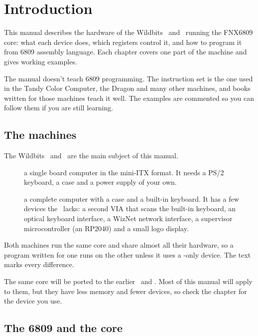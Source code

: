 \chapter{Introduction}
\label{chp:intro}

This manual describes the hardware of the Wildbits \jrtwo\ and \ktwo\ running the FNX6809 core: what each device does, which registers control it, and how to program it from 6809 assembly language. Each chapter covers one part of the machine and gives working examples.

The manual doesn't teach 6809 programming. The instruction set is the one used in the Tandy Color Computer, the Dragon and many other machines, and books written for those machines teach it well. The examples are commented so you can follow them if you are still learning.

\section{The machines}

The Wildbits \jrtwo\ and \ktwo\ are the main subject of this manual.

\begin{description}
    \item[\jrtwo] a single board computer in the mini-ITX format. It needs a PS/2 keyboard, a case and a power supply of your own.
    \item[\ktwo] a complete computer with a case and a built-in keyboard. It has a few devices the \jrtwo\ lacks: a second VIA that scans the built-in keyboard, an optical keyboard interface, a WizNet network interface, a supervisor microcontroller (an RP2040) and a small logo display.
\end{description}

Both machines run the same core and share almost all their hardware, so a program written for one runs on the other unless it uses a \ktwo-only device. The text marks every difference.

\begin{note}
    The same core will be ported to the earlier \fjr\ and \fk. Most of this manual will apply to them, but they have less memory and fewer devices, so check the chapter for the device you use.
\end{note}

\section{The 6809 and the core}

